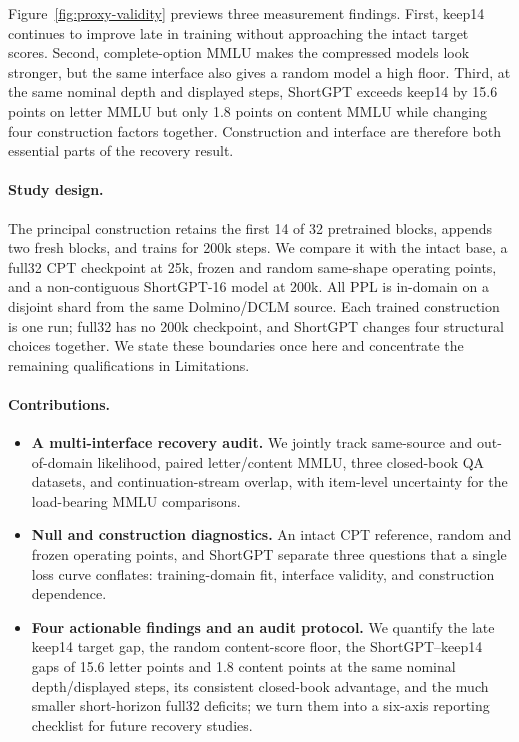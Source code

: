 Figure~\ref{fig:proxy-validity} previews three measurement findings. First,
keep14 continues to improve late in training without approaching the intact
target scores. Second, complete-option MMLU makes the compressed models look
stronger, but the same interface also gives a random model a high floor. Third,
at the same nominal depth and displayed steps, ShortGPT exceeds keep14 by
15.6 points on letter MMLU but only 1.8 points on content MMLU while changing
four construction factors together. Construction and interface are therefore
both essential parts of the recovery result.

\paragraph{Study design.}
The principal construction retains the first 14 of 32 pretrained blocks,
appends two fresh blocks, and trains for 200k steps. We compare it with the
intact base, a full32 CPT checkpoint at 25k, frozen and random same-shape
operating points, and a non-contiguous ShortGPT-16 model at 200k. All PPL is
in-domain on a disjoint shard from the same Dolmino/DCLM source. Each trained
construction is one run; full32 has no 200k checkpoint, and ShortGPT changes
four structural choices together. We state these boundaries once here and
concentrate the remaining qualifications in Limitations.

\paragraph{Contributions.}
\begin{itemize}[leftmargin=1.2em,itemsep=2pt]
\item \textbf{A multi-interface recovery audit.} We jointly track same-source
and out-of-domain likelihood, paired letter/content MMLU, three closed-book QA
datasets, and continuation-stream overlap, with item-level uncertainty for the
load-bearing MMLU comparisons.
\item \textbf{Null and construction diagnostics.} An intact CPT reference,
random and frozen operating points, and ShortGPT separate three questions that
a single loss curve conflates: training-domain fit, interface validity, and
construction dependence.
\item \textbf{Four actionable findings and an audit protocol.} We quantify the
late keep14 target gap, the random content-score floor, the
ShortGPT--keep14 gaps of 15.6 letter points and 1.8 content points at the same
nominal depth/displayed steps, its consistent closed-book advantage, and the
much smaller short-horizon full32 deficits;
we turn them into a six-axis reporting checklist for future recovery studies.
\end{itemize}
